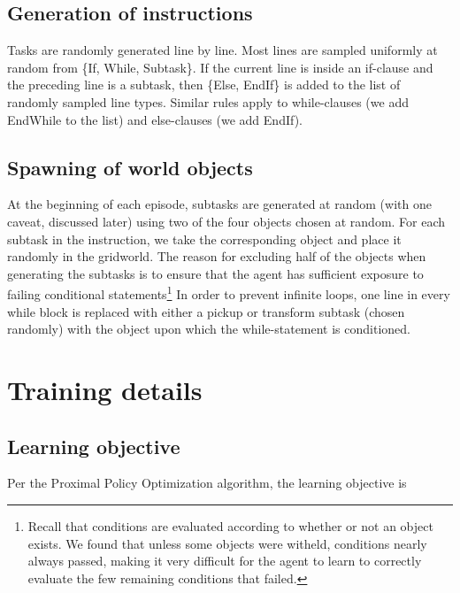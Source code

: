 \documentclass{article}
\begin{document}
\subsection{Generation of instructions}
Tasks are randomly generated line by line. Most lines are sampled uniformly at
random from \{If, While, Subtask\}. If the current line is inside an if-clause and
the preceding line is a subtask, then \{Else, EndIf\} is added to the list of
randomly sampled line types. Similar rules apply to while-clauses (we add
EndWhile to the list) and else-clauses (we add EndIf). 


\subsection{Spawning of world objects}
At the beginning of each episode, subtasks are generated at random (with one caveat, discussed later) using two of the four objects  chosen at random. 
For each subtask in the instruction, we take the corresponding object and place it randomly in the gridworld. The reason for excluding half of the objects when generating the subtasks is to ensure that the agent has sufficient exposure to failing conditional statements\footnote{Recall that conditions are evaluated according to whether or not an object exists. We found that unless some objects were witheld, conditions nearly always passed, making it very difficult for the agent to learn to correctly evaluate the few remaining conditions that failed.} In order to prevent infinite loops, one line in every while block is replaced with either a pickup or transform subtask (chosen randomly) with the object upon which the while-statement is conditioned. 


\section{Training details}
\label{training}
\subsection{Learning objective}
Per the Proximal Policy Optimization algorithm, the learning objective is
\end{document}
